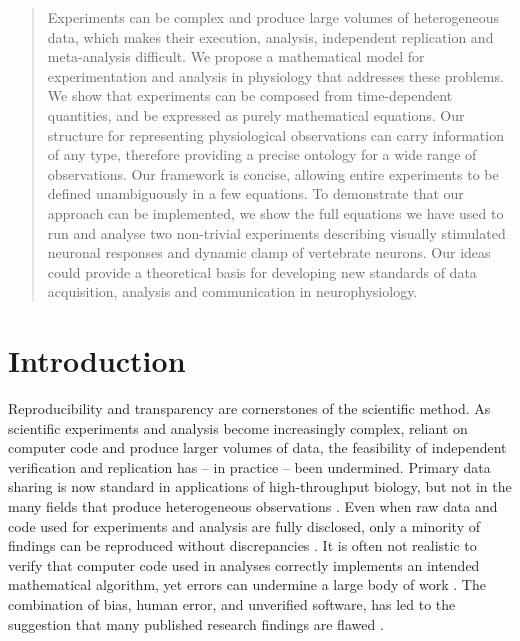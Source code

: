 \begin{abstract}
  Experiments can be complex and produce large volumes of
  heterogeneous data, which makes their execution, analysis,
  independent replication and meta-analysis difficult. We propose a
  mathematical model for experimentation and analysis in physiology
  that addresses these problems. We show that experiments can be
  composed from time-dependent quantities, and be expressed as purely
  mathematical equations. Our structure for representing physiological
  observations can carry information of any type, therefore providing
  a precise ontology for a wide range of observations. Our framework
  is concise, allowing entire experiments to be defined unambiguously
  in a few equations. To demonstrate that our approach can be
  implemented, we show the full equations we have used to run and
  analyse two non-trivial experiments describing visually stimulated
  neuronal responses and dynamic clamp of vertebrate neurons. Our
  ideas could provide a theoretical basis for developing new standards
  of data acquisition, analysis and communication in neurophysiology.
\end{abstract}


\section{Introduction}

Reproducibility and transparency are cornerstones of the scientific
method. As scientific experiments and analysis become increasingly
complex, reliant on computer code and produce larger volumes of data,
the feasibility of independent verification and replication has -- in
practice -- been undermined. Primary data sharing is now standard in
applications of high-throughput biology, but not in the many fields
that produce heterogeneous observations \cite{Gardner2005,
  Tukey1962}. Even when raw data and code used for experiments and
analysis are fully disclosed, only a minority of findings can be
reproduced without discrepancies \cite{Ioannidis2008,Baggerly2009,
  McCullough2007}. It is often not realistic to verify that computer
code used in analyses correctly implements an intended mathematical
algorithm, yet errors can undermine a large body of work
\cite{Chang2006}. The combination of bias, human error, and unverified
software, has led to the suggestion that many published research
findings are flawed \cite{Ioannidis2005, Merali2010}.

